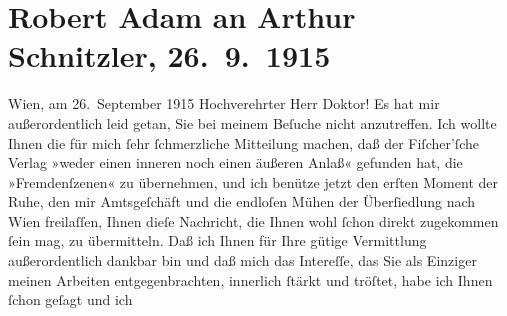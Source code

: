 

         \renewcommand{\erwaehnteInstitutionen}{Institutionen: Bezirksgericht Wien Floridsdorf, S. Fischer Verlag}
         \renewcommand{\erwaehnteOrte}{Orte: Meidlinger Hauptstraße, Wien, XII., Meidling, XXI., Floridsdorf, Zistersdorf}
         \renewcommand{\erwaehnteWerke}{Werke: Der Fremde}
               \section[Robert Adam an Arthur Schnitzler, 26. 9. 1915]{ Robert Adam an Arthur Schnitzler, 26. 9. 1915}\nopagebreak{}\rehead{ }\begin{ledgroupsized}[t]{13cm}\normalsize\beginnumbering \toendnotes[C]{\smallbreak\pagebreak[2]} 
\pstart
           \raggedleft{}{\pb}Wien, am 26. September 1915\pend
           \pstart{}Hochverehrter Herr Doktor!\pend\pstart
           Es hat mir außerordentlich leid getan, Sie bei meinem Beſuche nicht anzutreffen. Ich
               wollte Ihnen die für mich ſehr ſchmerzliche Mitteilung machen, daß der Fiſcher’ſche Verlag »weder einen inneren noch
               einen äußeren Anlaß« gefunden hat, die »Fremdenſzenen« zu übernehmen, und ich benütze jetzt den erſten Moment der
               Ruhe, den mir Amtsgeſchäft und die endloſen Mühen der Überſiedlung nach Wien freilaſſen, Ihnen dieſe Nachricht, die Ihnen
               wohl ſchon direkt zugekommen ſein mag, zu übermitteln.\pend
           \pstart
           Daß ich Ihnen für Ihre gütige Vermittlung außerordentlich dankbar bin und daß mich
               das {\pb}Intereſſe, das Sie als Einziger meinen Arbeiten
               entgegenbrachten, innerlich ſtärkt und tröſtet, habe ich Ihnen ſchon geſagt und ich

\end{ledgroupsized}
